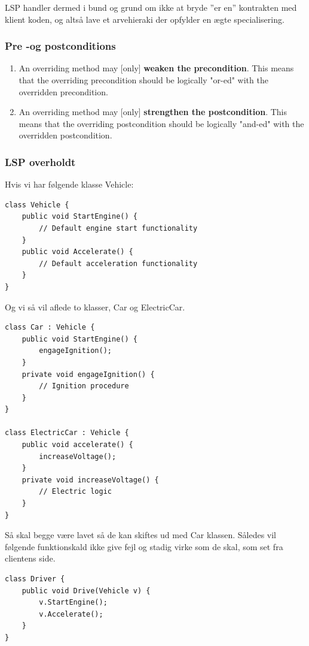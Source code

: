 LSP handler dermed i bund og grund om ikke at bryde ”er en” kontrakten med klient koden, og altså lave et arvehieraki der opfylder en ægte specialisering.

\subsubsection{Pre -og postconditions}

\begin{enumerate}
	\item An overriding method may [only] \textbf{weaken the precondition}. This means
	that the overriding precondition should be logically "or-ed" with the
	overridden precondition.
	\item An overriding method may [only] \textbf{strengthen the postcondition}. This
	means that the overriding postcondition should be logically "and-ed" with
	the overridden postcondition.
\end{enumerate}

\subsubsection{LSP overholdt}
Hvis vi har følgende klasse Vehicle:

\begin{lstlisting}
class Vehicle {
	public void StartEngine() {
		// Default engine start functionality
	}
	public void Accelerate() {
		// Default acceleration functionality
	}
}
\end{lstlisting}

Og vi så vil aflede to klasser, Car og ElectricCar.

\begin{lstlisting}
class Car : Vehicle {
	public void StartEngine() {
		engageIgnition();
	}
	private void engageIgnition() {
		// Ignition procedure
	}
}

class ElectricCar : Vehicle {
	public void accelerate() {
		increaseVoltage();
	}
	private void increaseVoltage() {
		// Electric logic
	}
}
\end{lstlisting}

Så skal begge være lavet så de kan skiftes ud med Car klassen. Således vil følgende funktionskald ikke give fejl og stadig virke som de skal, som set fra clientens side.

\begin{lstlisting}
class Driver {
	public void Drive(Vehicle v) {
		v.StartEngine();
		v.Accelerate();
	}
}
\end{lstlisting}

